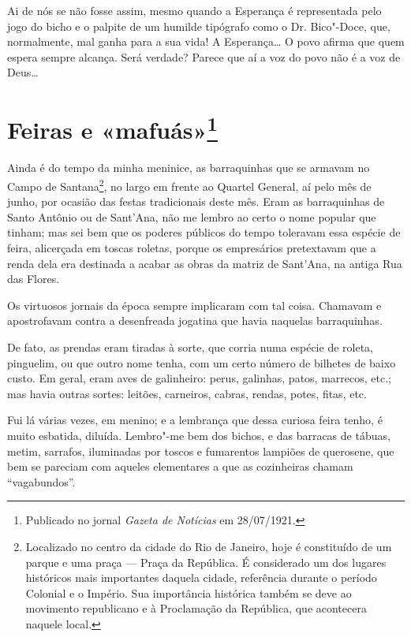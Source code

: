 Ai de nós se não fosse assim, mesmo quando a Esperança é representada
pelo jogo do bicho e o palpite de um humilde tipógrafo como o Dr.
Bico"-Doce, que, normalmente, mal ganha para a sua vida! A
Esperança\ldots{} O povo afirma que quem espera sempre alcança. Será
verdade? Parece que aí a voz do povo não é a voz de Deus\ldots{}



\chapter[Feiras e «mafuás»]{Feiras e «mafuás»\footnote[*]{Publicado no jornal \emph{Gazeta de Notícias} em 28/07/1921.}}

Ainda é do tempo da minha meninice, as barraquinhas que se armavam no
Campo de Santana\footnote{Localizado no centro da cidade do Rio de
  Janeiro, hoje é constituído de um parque e uma praça --- Praça da
  República. É considerado um dos lugares históricos mais importantes
  daquela cidade, referência durante o período Colonial e o Império. Sua
  importância histórica também se deve ao movimento republicano e à
  Proclamação da República, que acontecera naquele local.}, no largo em
frente ao Quartel General, aí pelo mês de junho, por ocasião das festas
tradicionais deste mês. Eram as barraquinhas de Santo Antônio ou de
Sant'Ana, não me lembro ao certo o nome popular que tinham; mas sei bem
que os poderes públicos do tempo toleravam essa espécie de feira,
alicerçada em toscas roletas, porque os empresários pretextavam que a
renda dela era destinada a acabar as obras da matriz de Sant'Ana, na
antiga Rua das Flores.

Os virtuosos jornais da época sempre implicaram com tal coisa. Chamavam
e apostrofavam contra a desenfreada jogatina que havia naquelas
barraquinhas.

De fato, as prendas eram tiradas à sorte, que corria numa espécie de
roleta, pinguelim, ou que outro nome tenha, com um certo número de
bilhetes de baixo custo. Em geral, eram aves de galinheiro: perus,
galinhas, patos, marrecos, etc.; mas havia outras sortes: leitões,
carneiros, cabras, rendas, potes, fitas, etc.

Fui lá várias vezes, em menino; e a lembrança que dessa curiosa feira
tenho, é muito esbatida, diluída. Lembro"-me bem dos bichos, e das
barracas de tábuas, metim, sarrafos, iluminadas por toscos e fumarentos
lampiões de querosene, que bem se pareciam com aqueles elementares a que
as cozinheiras chamam ``vagabundos''.

